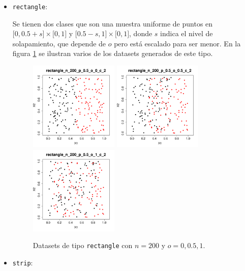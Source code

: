 \documentclass[a4paper,12pt]{report}
\theoremstyle{definition}
\begin{document}
\begin{itemize}
\item \verb|rectangle|:

  Se tienen dos clases que son una muestra uniforme de puntos en $\lbrack 0, 0.5+s \rbrack \times \lbrack 0,1 \rbrack$ y $\lbrack 0.5-s, 1 \rbrack \times \lbrack 0,1 \rbrack$, donde $s$ indica el nivel de solapamiento, que depende de $o$ pero está escalado para ser menor. En la figura \ref{fig:rectangle} se ilustran varios de los datasets generados de este tipo.

  \begin{figure}[H]
    \centering
    \includegraphics[width=0.4\textwidth]{plots/rectangle_o_0}
    \includegraphics[width=0.4\textwidth]{plots/rectangle_o_1}
    \includegraphics[width=0.4\textwidth]{plots/rectangle_o_2}
    \caption{Datasets de tipo \texttt{rectangle} con $n = 200$ y $o = 0, 0.5, 1$.}
    \label{fig:rectangle}
  \end{figure}

\item \verb|strip|:


\end{itemize}
\end{document}
